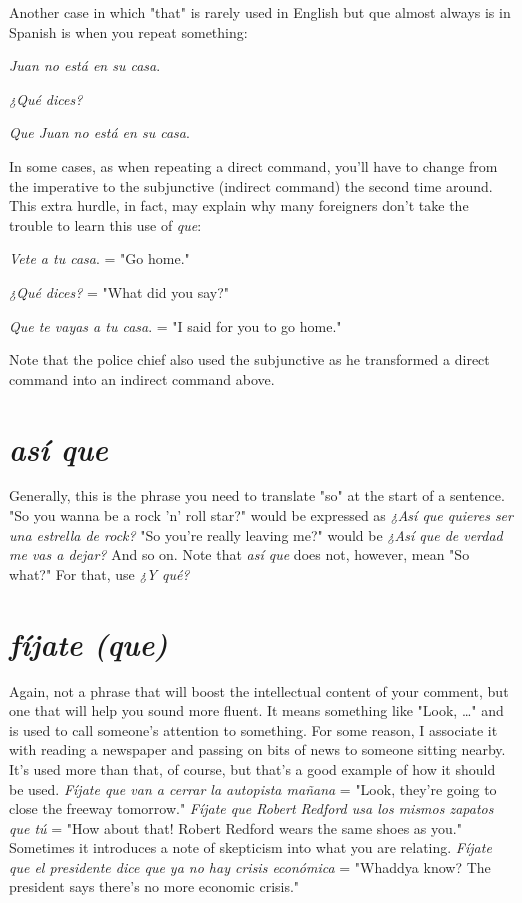 Another case in which "that" is rarely used in English but que
almost always is in Spanish is when you repeat something:

\bsk

\indu \emph{Juan no está en su casa}.

\indu \emph{¿Qué dices?}

\indu \emph{Que Juan no está en su casa}.

\bsk

In some cases, as when repeating a direct command, you'll have to
change from the imperative to the subjunctive (indirect command) the
second time around. This extra hurdle, in fact, may explain why many
foreigners don't take the trouble to learn this use of \emph{que}:

\bsk

\indu \emph{Vete a tu casa}. = "Go home."

\indu \emph{¿Qué dices?} = "What did you say?"

\indu \emph{Que te vayas a tu casa}. = "I said for you to go home."

\bsk

Note that the police chief also used the subjunctive as he transformed
a direct command into an indirect command above.

\section{\emph{así que}}

Generally, this is the phrase you need to translate "so" at the
start of a sentence. "So you wanna be a rock 'n' roll star?" would be
expressed as \emph{¿Así que quieres ser una estrella de rock?} "So you're
really leaving me?" would be \emph{¿Así que de verdad me vas a dejar?} And
so on. Note that \emph{así que} does not, however, mean "So what?" For that,
use \emph{¿Y qué?}

\section{\emph{fíjate (que)}}

Again, not a phrase that will boost the intellectual content of
your comment, but one that will help you sound more fluent. It means
something like "Look, \ldots{}" and is used to call someone's attention to
something. For some reason, I associate it with reading a newspaper
and passing on bits of news to someone sitting nearby. It's used more
than that, of course, but that's a good example of how it should be
used. \emph{Fíjate que van a cerrar la autopista mañana} = "Look, they're
going to close the freeway tomorrow." \emph{Fíjate que Robert Redford usa
los mismos zapatos que tú} = "How about that! Robert Redford wears
the same shoes as you." Sometimes it introduces a note of skepticism
into what you are relating. \emph{Fíjate que el presidente dice que ya no hay
crisis económica} = "Whaddya know? The president says there's no
more economic crisis."

